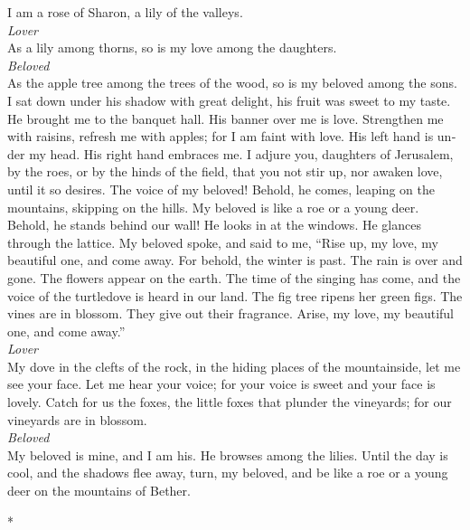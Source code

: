 \begin{paracol}{2}
\begin{otherlanguage}{english}
 I am a rose of Sharon, a lily of the valleys.\\
\emph{Lover }\\
 As a lily among thorns, so is my love among the
daughters.\\
\emph{Beloved }\\
 As the apple tree among the trees of the wood, so is my
beloved among the sons. I sat down under his shadow with great delight,
his fruit was sweet to my taste.  He brought me to the
banquet hall. His banner over me is love.  Strengthen me
with raisins, refresh me with apples; for I am faint with love.
 His left hand is under my head. His right hand embraces
me.  I adjure you, daughters of Jerusalem, by the roes, or
by the hinds of the field, that you not stir up, nor awaken love, until
it so desires.  The voice of my beloved! Behold, he comes,
leaping on the mountains, skipping on the hills.  My
beloved is like a roe or a young deer. Behold, he stands behind our
wall! He looks in at the windows. He glances through the lattice.
 My beloved spoke, and said to me, ``Rise up, my love, my
beautiful one, and come away.  For behold, the winter is
past. The rain is over and gone.  The flowers appear on
the earth. The time of the singing has come, and the voice of the
turtledove is heard in our land.  The fig tree ripens her
green figs. The vines are in blossom. They give out their fragrance.
Arise, my love, my beautiful one, and come away.''\\
\emph{Lover }\\
 My dove in the clefts of the rock, in the hiding places
of the mountainside, let me see your face. Let me hear your voice; for
your voice is sweet and your face is lovely.  Catch for
us the foxes, the little foxes that plunder the vineyards; for our
vineyards are in blossom.\\
\emph{Beloved }\\
 My beloved is mine, and I am his. He browses among the
lilies.  Until the day is cool, and the shadows flee
away, turn, my beloved, and be like a roe or a young deer on the
mountains of Bether.

\end{otherlanguage}

\switchcolumn[0]*

\hypertarget{sueuxf1o-anhelante-de-la-novia}{%
}
\end{paracol}
